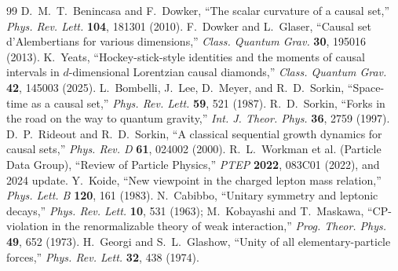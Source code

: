 \documentclass[11pt]{article}
\begin{document}
\begin{thebibliography}{99}
 D.~M.~T.~Benincasa and F.~Dowker, ``The scalar curvature of a causal set,'' \emph{Phys. Rev. Lett.} \textbf{104}, 181301 (2010).
 F.~Dowker and L.~Glaser, ``Causal set d'Alembertians for various dimensions,'' \emph{Class. Quantum Grav.} \textbf{30}, 195016 (2013).
 K.~Yeats, ``Hockey-stick-style identities and the moments of causal intervals in $d$-dimensional Lorentzian causal diamonds,'' \emph{Class. Quantum Grav.} \textbf{42}, 145003 (2025).
 L.~Bombelli, J.~Lee, D.~Meyer, and R.~D.~Sorkin, ``Space-time as a causal set,'' \emph{Phys. Rev. Lett.} \textbf{59}, 521 (1987).
 R.~D.~Sorkin, ``Forks in the road on the way to quantum gravity,'' \emph{Int. J. Theor. Phys.} \textbf{36}, 2759 (1997).
 D.~P.~Rideout and R.~D.~Sorkin, ``A classical sequential growth dynamics for causal sets,'' \emph{Phys. Rev. D} \textbf{61}, 024002 (2000).
 R.~L.~Workman et al. (Particle Data Group), ``Review of Particle Physics,'' \emph{PTEP} \textbf{2022}, 083C01 (2022), and 2024 update.
 Y.~Koide, ``New viewpoint in the charged lepton mass relation,'' \emph{Phys. Lett. B} \textbf{120}, 161 (1983).
 N.~Cabibbo, ``Unitary symmetry and leptonic decays,'' \emph{Phys. Rev. Lett.} \textbf{10}, 531 (1963); M.~Kobayashi and T.~Maskawa, ``CP-violation in the renormalizable theory of weak interaction,'' \emph{Prog. Theor. Phys.} \textbf{49}, 652 (1973).
 H.~Georgi and S.~L.~Glashow, ``Unity of all elementary-particle forces,'' \emph{Phys. Rev. Lett.} \textbf{32}, 438 (1974).
\end{thebibliography}
\end{document}
